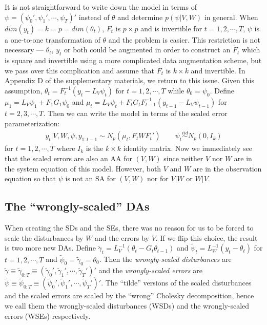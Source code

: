 \documentclass[12pt]{article}
\begin{document}
It is not straightforward to write down the model in terms of $\psi=(\psi_0',\psi_1',\cdots,\psi_T)'$ instead of $\theta$ and determine $p(\psi|V,W)$ in general. When $dim(y_t)=k=p=dim(\theta_t)$, $F_t$ is $p\times p$ and is invertible for $t=1,2,\cdots,T$, $\psi$ is a one-to-one transformation of $\theta$ and the problem is easier. This restriction is not necessary --- $\theta_t$, $y_t$ or both could be augmented in order to construct an $\tilde{F}_t$ which is square and invertible using a more complicated data augmentation scheme, but we pass over this complication and assume that $F_t$ is $k\times k$ and invertible. In Appendix D of the supplementary materials, we return to this issue. Given this assumption, $\theta_t = F_t^{-1}(y_t - L_V\psi_t)$ for $t=1,2,\cdots,T$ while $\theta_0=\psi_0$. Define $\mu_1 = L_V\psi_1 + F_1G_1\psi_0$ and $\mu_t =L_V\psi_t + F_tG_tF_{t-1}^{-1}(y_{t-1} - L_{V}\psi_{t-1})$ for $t=2,3,\cdots,T$. Then we can write the model in terms of the scaled error parameterization:
\begin{align*}
  y_t|V,W,\psi,y_{1:t-1} \sim N_p(\mu_t, F_tWF_t') \qquad \psi_t  \stackrel{iid}{\sim} N_p(0,I_k)
\end{align*}
for $t=1,2,\cdots,T$ where $I_k$ is the $k\times k$ identity matrix. Now we immediately see that the scaled errors are also an AA for $(V,W)$ since neither $V$ nor $W$ are in the system equation of this model. However, both $V$ and $W$ are in the observation equation so that $\psi$ is not an SA for $(V,W)$ nor for $V|W$ or $W|V$.

\subsection{The ``wrongly-scaled'' DAs}
When creating the SDs and the SEs, there was no reason for us to be forced to scale the disturbances by $W$ and the errors by $V$. If we flip this choice, the result is two more new DAs. Define $\tilde{\gamma}_t=L_V^{-1}(\theta_t - G_t\theta_{t-1})$ and $\tilde{\psi}_t=L_W^{-1}(y_t - \theta_t)$ for $t=1,2,\cdots,T$ and $\tilde{\psi}_0=\tilde{\gamma}_0=\theta_0$. Then the {\it wrongly-scaled disturbances} are $\tilde{\gamma}\equiv\tilde{\gamma}_{0:T}\equiv(\tilde{\gamma}_0',\tilde{\gamma}_1',\cdots,\tilde{\gamma}_T')'$ and the {\it wrongly-scaled errors} are $\tilde{\psi}\equiv\tilde{\psi}_{0:T}\equiv(\tilde{\psi}_0',\tilde{\psi}_1',\cdots,\tilde{\psi}_T')'$. The ``tilde'' versions of the scaled disturbances and the scaled errors are scaled by the ``wrong'' Cholesky decomposition, hence we call them the wrongly-scaled disturbances (WSDs) and the wrongly-scaled errors (WSEs) respectively.
\end{document}
